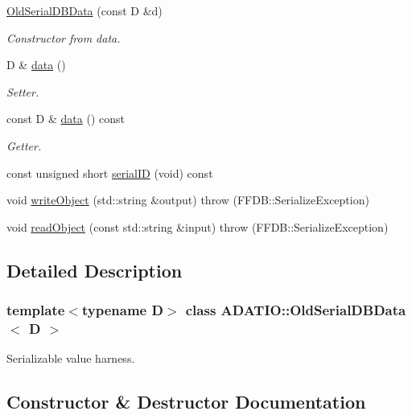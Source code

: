 \begin{DoxyCompactItemize}
\mbox{\hyperlink{classADATIO_1_1OldSerialDBData_ada293b92b5081fbb6e82364196ff5524}{Old\+Serial\+D\+B\+Data}} (const D \&d)
\begin{DoxyCompactList}\small\item\em Constructor from data. \end{DoxyCompactList}\item 
D \& \mbox{\hyperlink{classADATIO_1_1OldSerialDBData_ad917fd5898616290b7c0d30cb878850f}{data}} ()
\begin{DoxyCompactList}\small\item\em Setter. \end{DoxyCompactList}\item 
const D \& \mbox{\hyperlink{classADATIO_1_1OldSerialDBData_a4d5c8f72f1f572f26127f728b202e345}{data}} () const
\begin{DoxyCompactList}\small\item\em Getter. \end{DoxyCompactList}\item 
const unsigned short \mbox{\hyperlink{classADATIO_1_1OldSerialDBData_a379c8edee426f2a5ce3f41d0c46777de}{serial\+ID}} (void) const
\item 
void \mbox{\hyperlink{classADATIO_1_1OldSerialDBData_aec52af4bfb6beb74fc039b9b25328270}{write\+Object}} (std\+::string \&output)  throw (\+F\+F\+D\+B\+::\+Serialize\+Exception)
\item 
void \mbox{\hyperlink{classADATIO_1_1OldSerialDBData_aad0338cd19224fe3eb6223afe7e2c2c4}{read\+Object}} (const std\+::string \&input)  throw (\+F\+F\+D\+B\+::\+Serialize\+Exception)
\end{DoxyCompactItemize}


\subsection{Detailed Description}
\subsubsection*{template$<$typename D$>$\newline
class A\+D\+A\+T\+I\+O\+::\+Old\+Serial\+D\+B\+Data$<$ D $>$}

Serializable value harness. 



\subsection{Constructor \& Destructor Documentation}
\mbox{\label{classADATIO_1_1OldSerialDBData_a189c0c4ac35db492b9cbc68deb15c5dd}} 
